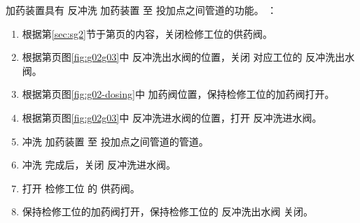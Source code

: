 
加药装置具有 反冲洗 加药装置 至 投加点之间管道的功能。
：
\begin{enumerate}
    \item 根据第\ref{sec:sg2}节于第\pageref{sec:sg2}页的内容，关闭检修工位的供药阀。
    \item 根据第\pageref{fig:g02g03}页图\ref{fig:g02g03}中 反冲洗出水阀的位置，关闭 对应工位的 反冲洗出水阀。
    \item 根据第\pageref{fig:g02-dosing}页图\ref{fig:g02-dosing}中 加药阀位置，保持检修工位的加药阀打开。
    \item 根据第\pageref{fig:g02g03}页图\ref{fig:g02g03}中 反冲洗进水阀的位置，打开 反冲洗进水阀。
    \item 冲洗 加药装置 至 投加点之间管道的管道。
    \item 冲洗 完成后，关闭 反冲洗进水阀。
    \item 打开 检修工位 的 供药阀。
    \item 保持检修工位的加药阀打开，保持检修工位的 反冲洗出水阀 关闭。
\end{enumerate}


